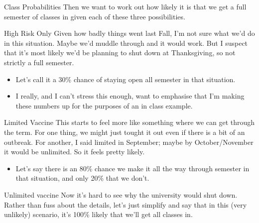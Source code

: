 \documentclass[
  ignorenonframetext,
]{beamer}
\providecommand{\tightlist}{%
  \setlength{\itemsep}{0pt}\setlength{\parskip}{0pt}}
\renewcommand{\,}{\text{, }}
\begin{document}
\begin{frame}{Class Probabilities}
\protect\hypertarget{class-probabilities}{}
Then we want to work out how likely it is that we get a full semester of
classes in given each of these three possibilities.
\end{frame}

\begin{frame}{High Risk Only}
\protect\hypertarget{high-risk-only}{}
Given how badly things went last Fall, I'm not sure what we'd do in this
situation. Maybe we'd muddle through and it would work. But I suspect
that it's most likely we'd be planning to shut down at Thanksgiving, so
not strictly a full semester.

\begin{itemize}[<+->]
\tightlist
\item
  Let's call it a 30\% chance of staying open all semester in that
  situation.
\item
  I really, and I can't stress this enough, want to emphasise that I'm
  making these numbers up for the purposes of an in class example.
\end{itemize}
\end{frame}

\begin{frame}{Limited Vaccine}
\protect\hypertarget{limited-vaccine}{}
This starts to feel more like something where we can get through the
term. For one thing, we might just tought it out even if there is a bit
of an outbreak. For another, I said limited in September; maybe by
October/November it would be unlimited. So it feels pretty likely.

\begin{itemize}
\tightlist
\item
  Let's say there is an 80\% chance we make it all the way through
  semester in that situation, and only 20\% that we don't.
\end{itemize}
\end{frame}

\begin{frame}{Unlimited vaccine}
\protect\hypertarget{unlimited-vaccine}{}
Now it's hard to see why the university would shut down. Rather than
fuss about the details, let's just simplify and say that in this (very
unlikely) scenario, it's 100\% likely that we'll get all classes in.
\end{frame}
\end{document}
